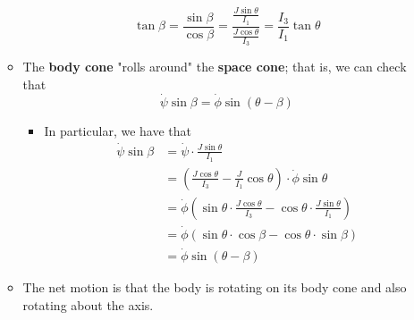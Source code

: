 \documentclass[../notes.tex]{subfiles}
\begin{document}
\begin{itemize}
\begin{itemize}
        \begin{equation*}
            \tan\beta = \frac{\sin\beta}{\cos\beta}
            = \frac{\frac{J\sin\theta}{I_1}}{\frac{J\cos\theta}{I_3}}
            = \frac{I_3}{I_1}\tan\theta
        \end{equation*}
        \item The \textbf{body cone} "rolls around" the \textbf{space cone}; that is, we can check that
        \begin{equation*}
            \dot{\psi}\sin\beta = \dot{\phi}\sin(\theta-\beta)
        \end{equation*}
        \begin{itemize}
            \item In particular, we have that
            \begin{align*}
                \dot{\psi}\sin\beta &= \dot{\psi}\cdot\frac{J\sin\theta}{I_1}\\
                &= \left( \frac{J\cos\theta}{I_3}-\frac{J}{I_1}\cos\theta \right)\cdot\dot{\phi}\sin\theta\\
                &= \dot{\phi}\left( \sin\theta\cdot\frac{J\cos\theta}{I_3}-\cos\theta\cdot\frac{J\sin\theta}{I_1} \right)\\
                &= \dot{\phi}(\sin\theta\cdot\cos\beta-\cos\theta\cdot\sin\beta)\\
                &= \dot{\phi}\sin(\theta-\beta)
            \end{align*}
        \end{itemize}
        \item The net motion is that the body is rotating on its body cone and also rotating about the axis.
    \end{itemize}
\end{itemize}
\end{document}
